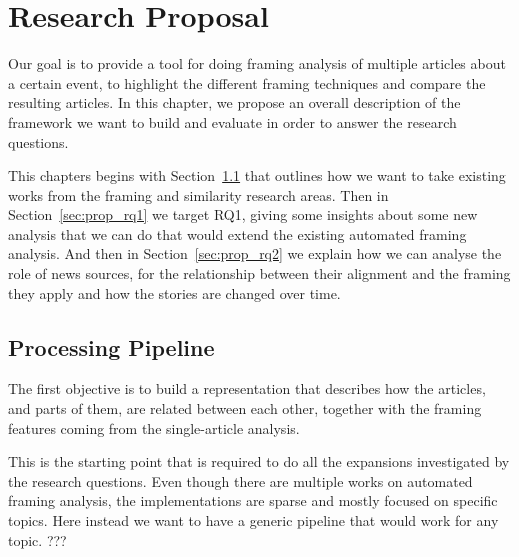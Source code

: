 \chapter{Research Proposal}
\label{chap:proposal}





Our goal is to provide a tool for doing framing analysis of multiple articles about a certain event, to highlight the different framing techniques and compare the resulting articles.
In this chapter, we propose an overall description of the framework we want to build and evaluate in order to answer the research questions.

This chapters begins with Section~\ref{sec:prop_pipeline} that outlines how we want to take existing works from the framing and similarity research areas.
Then in Section~\ref{sec:prop_rq1} we target RQ1, giving some insights about some new analysis that we can do that would extend the existing automated framing analysis.
And then in Section~\ref{sec:prop_rq2} we explain how we can analyse the role of news sources, for the relationship between their alignment and the framing they apply and how the stories are changed over time.

\section{Processing Pipeline}
\label{sec:prop_pipeline}
The first objective is to build a representation that describes how the articles, and parts of them, are related between each other, together with the framing features coming from the single-article analysis.

This is the starting point that is required to do all the expansions investigated by the research questions.
Even though there are multiple works on automated framing analysis, the implementations are sparse and mostly focused on specific topics.
Here instead we want to have a generic pipeline that would work for any topic.
???

